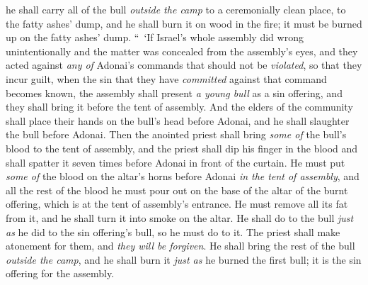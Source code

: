 \begin{biblechapter}
\verse he shall carry all of the bull \textit{outside the camp} to a ceremonially clean place, to the fatty ashes’ dump, and he shall burn it on wood in the fire; it must be burned up on the fatty ashes’ dump.
\verse “ ‘If Israel’s whole assembly did wrong unintentionally and the matter was concealed from the assembly’s eyes, and they acted against \textit{any of} Adonai’s commands that should not be \textit{violated}, so that they incur guilt,
\verse when the sin that they have \textit{committed} against that command becomes known, the assembly shall present \textit{a young bull} as a sin offering, and they shall bring it before the tent of assembly.
\verse And the elders of the community shall place their hands on the bull’s head before Adonai, and he shall slaughter the bull before Adonai.
\verse Then the anointed priest shall bring \textit{some of} the bull’s blood to the tent of assembly,
\verse and the priest shall dip his finger in the blood and shall spatter it seven times before Adonai in front of the curtain.
\verse He must put \textit{some of} the blood on the altar’s horns before Adonai \textit{in the tent of assembly}, and all the rest of the blood he must pour out on the base of the altar of the burnt offering, which is at the tent of assembly’s entrance.
\verse He must remove all its fat from it, and he shall turn it into smoke on the altar.
\verse He shall do to the bull \textit{just as} he did to the sin offering’s bull, so he must do to it. The priest shall make atonement for them, and \textit{they will be forgiven}.
\verse He shall bring the rest of the bull \textit{outside the camp}, and he shall burn it \textit{just as} he burned the first bull; it is the sin offering for the assembly.

\end{biblechapter}

